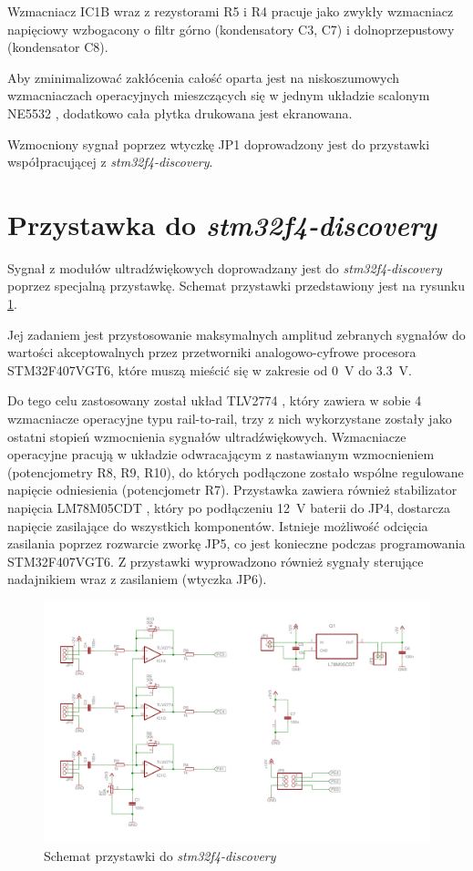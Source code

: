 Wzmacniacz IC1B wraz z rezystorami R5 i R4 pracuje jako zwykły wzmacniacz napięciowy wzbogacony o 
filtr górno (kondensatory C3, C7) i dolnoprzepustowy 
(kondensator C8).

Aby zminimalizować zakłócenia całość oparta jest na niskoszumowych wzmacniaczach operacyjnych
mieszczących się w jednym układzie scalonym NE5532 \cite{bib:ne5532}, 
dodatkowo cała płytka drukowana jest ekranowana.

Wzmocniony sygnał poprzez wtyczkę JP1 doprowadzony jest do przystawki współpracującej z \textit{stm32f4-discovery}.

\clearpage

\section{Przystawka do \textit{stm32f4-discovery}}

Sygnał z modułów ultradźwiękowych doprowadzany jest do \textit{stm32f4-discovery} poprzez specjalną przystawkę.
Schemat przystawki przedstawiony jest na rysunku \ref{fig:przystawka}.

Jej zadaniem jest przystosowanie maksymalnych amplitud zebranych sygnałów do wartości akceptowalnych przez  
przetworniki analogowo-cyfrowe procesora STM32F407VGT6, które muszą mieścić się w zakresie od \SI{0}{V} do \SI{3,3}{V}.

Do tego celu zastosowany został układ TLV2774 \cite{bib:TLV2774}, który zawiera w sobie 4 wzmacniacze operacyjne typu
rail-to-rail, trzy z nich wykorzystane zostały jako ostatni stopień wzmocnienia sygnałów ultradźwiękowych. 
Wzmacniacze operacyjne pracują w układzie odwracającym z nastawianym wzmocnieniem (potencjometry R8, R9, R10), 
do których podłączone zostało wspólne regulowane napięcie odniesienia (potencjometr R7).
Przystawka zawiera również stabilizator napięcia LM78M05CDT \cite{bib:LM78M05CDT}, który po podłączeniu 
\SI{12}{V} baterii do JP4, dostarcza napięcie zasilające do wszystkich komponentów. 
Istnieje możliwość odcięcia zasilania poprzez rozwarcie zworkę JP5, co jest konieczne podczas programowania
STM32F407VGT6.
Z przystawki wyprowadzono również sygnały sterujące nadajnikiem wraz z zasilaniem (wtyczka JP6).


 \begin{figure}[h!]
    \centering
    \includegraphics[width=1\textwidth, trim= 5mm 0mm 0mm 0mm,clip]{mainboard2}
    \caption{Schemat przystawki do \textit{stm32f4-discovery}}
    \label{fig:przystawka}
\end{figure}


